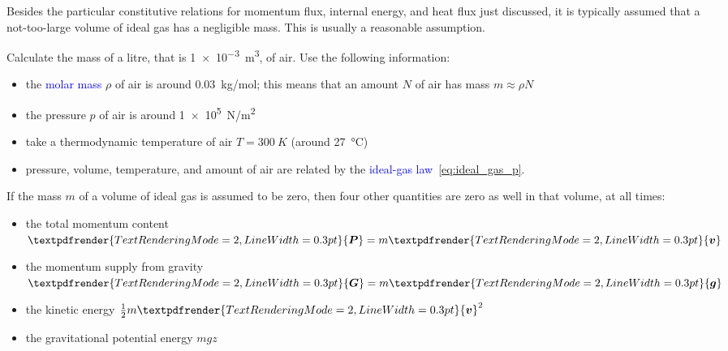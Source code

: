 \documentclass[a4paper,12pt,%
onecolumn,oneside,titlepage,%
british%
]{memoir}
\renewcommand*{\bm}[1]{\textpdfrender{TextRenderingMode=2,LineWidth=0.3pt}{\boldsymbol{#1}}}
\renewcommand*{\|}[1][]{\nonscript\:#1\vert\nonscript\:\mathopen{}}
\newcommand*{\sect}{\S}%
\renewcommand*{\autoref}[2]{\sidepar{\vspace{-1ex}\footnotesize{\color{blue}\faIcon{%
reply%
}\enspace\sect\,\ref{#1} page\,\pageref{#1}}}\textcolor{blue}{#2}}
\newcommand*{\yv}{\bm{v}}
\newcommand*{\yN}{N}
\newcommand*{\yrho}{\rho}
\newcommand*{\yM}{m}%
\newcommand*{\yg}{\bm{g}}%
\newcommand*{\yP}{\bm{P}}
\newcommand*{\yG}{\bm{G}}
\newcommand*{\yte}{T}%
\begin{document}
Besides the particular constitutive relations for momentum flux, internal energy, and heat flux just discussed, it is typically assumed that a not-too-large volume of ideal gas has a negligible mass. This is usually a reasonable assumption.
\begin{exercise}
  Calculate the mass of a litre, that is \qty[print-unity-mantissa=false]{1e-3}{m^3}, of air. Use the following information:
  \begin{itemize}[nosep]
  \item the \autoref{def:molarmass}{molar mass} $\yrho$ of air is around \qty{0.03}{kg/mol}; this means that an amount $\yN$ of air has mass $\yM\approx\yrho\yN$
  \item the pressure $p$ of air is around \qty[print-unity-mantissa=false]{1e5}{N/m^2}
  \item take a thermodynamic temperature of air $\yte=\qty{300}{K}$ (around \qty{27}{\degreeCelsius})
  \item pressure, volume, temperature, and amount of air are related by the \autoref{def:idealgas_law}{ideal-gas law}~\eqref{eq:ideal_gas_p}.
  \end{itemize}
\end{exercise}%

If the mass $\yM$ of a volume of ideal gas is assumed to be zero, then four other quantities are zero as well in that volume, at all times:
\begin{itemize}[nosep]
\item the total momentum content $\yP=\yM\yv$
\item the momentum supply from gravity $\yG=\yM\yg$
\item the kinetic energy $\tfrac12\yM\yv^{2}$
\item the gravitational potential energy $\yM g z$
\end{itemize}
\end{document}
